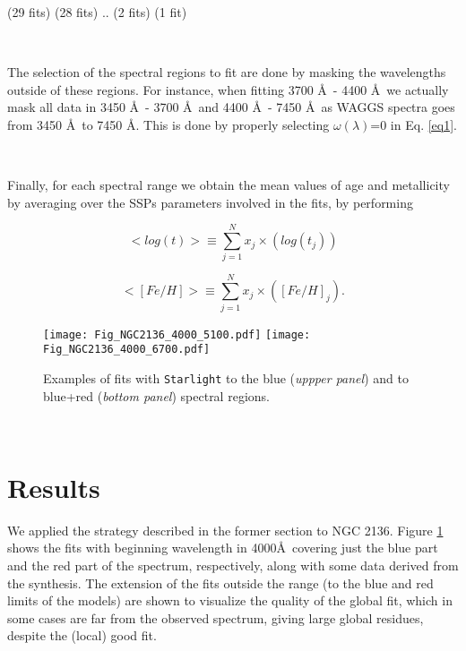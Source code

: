 \documentclass[baaa]{baaa}
\begin{document}
(29 fits)	  \hspace{0.5cm}	(28  fits)  \hspace{0.5cm}  ..	\hspace{0.5cm}    (2 fits)      \hspace{0.5cm}	(1 fit)

\

The selection of the spectral regions to fit are done by masking the wavelengths outside of these regions. For instance, when fitting 3700 \AA\ - 4400 \AA\ we actually mask all data in 3450 \AA\ - 3700 \AA\ and 4400 \AA\ - 7450 \AA\, as WAGGS spectra goes from 3450 \AA\ to 7450 \AA . This is done by properly selecting $\omega(\lambda)$=0 in Eq. \ref{eq1}.

\

Finally, for each spectral range we obtain the mean values of age and metallicity by averaging over the SSPs parameters involved in the fits, by performing

\begin{equation}
\label{eq2}
<log (t)> \equiv \sum_{j=1}^{N} x_j \times (log (t_j))
\end{equation}

\begin{equation}
\label{eq3}
<[Fe/H]> \equiv \sum_{j=1}^{N} x_j \times ([Fe/H]_j).
\end{equation}

\begin{figure}[!ht]
\centering
\texttt{[image: Fig\_NGC2136\_4000\_5100.pdf]}
\texttt{[image: Fig\_NGC2136\_4000\_6700.pdf]}
\caption{Examples of fits with {\tt Starlight} to the blue (\emph {uppper panel}) and to blue+red (\emph{bottom panel}) spectral regions.}
\label{Blue}
\end{figure}

\

\section{Results}

We applied the strategy described in the former section to NGC 2136. Figure \ref{Blue} shows the fits with beginning wavelength in 4000\AA\ covering just the blue part and the red part of the spectrum, respectively, along with some data derived from the synthesis. The extension of the fits outside the range (to the blue and red limits of the models) are shown to visualize the quality of the global fit, which in some cases are far from the observed spectrum, giving large global residues, despite the (local) good fit.
\end{document}
